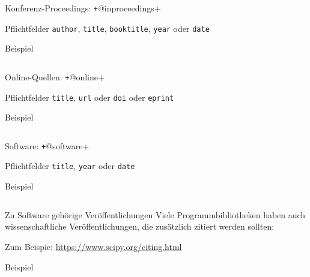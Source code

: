 \begin{frame}[fragile]{Konferenz-Proceedings: \texttt+@inproceedings+}
  \begin{block}{Pflichtfelder}
    \texttt{author}, \hspace{2em}
    \texttt{title}, \hspace{2em}
    \texttt{booktitle}, \hspace{2em}
    \texttt{year} oder \texttt{date}
  \end{block}

  \begin{block}{Beispiel}
    \inputminted[firstline=37, lastline=46]{bibtex}{examples.bib}
  \end{block}
\end{frame}

\begin{frame}[fragile]{Online-Quellen: \texttt+@online+}
  \begin{block}{Pflichtfelder}
    \texttt{title}, \hspace{2em}
    \texttt{url} oder \texttt{doi} oder \texttt{eprint}
  \end{block}

  \begin{block}{Beispiel}
    \inputminted[firstline=48, lastline=54]{bibtex}{examples.bib}
  \end{block}
\end{frame}

\begin{frame}[fragile]{Software: \texttt+@software+}
  \begin{block}{Pflichtfelder}
    \texttt{title}, \hspace{2em}
    \texttt{year} oder \texttt{date}
  \end{block}

  \begin{block}{Beispiel}
    \inputminted[firstline=62, lastline=67]{bibtex}{examples.bib}
  \end{block}
\end{frame}

\begin{frame}[fragile]{Zu Software gehörige Veröffentlichungen}
  Viele Programmbibliotheken haben auch wissenschaftliche Veröffentlichungen,
  die zusätzlich zitiert werden sollten:

  Zum Beispie: \url{https://www.scipy.org/citing.html}

  \begin{block}{Beispiel}
    \footnotesize
    \inputminted[firstline=69, lastline=85]{bibtex}{examples.bib}
  \end{block}

\end{frame}

